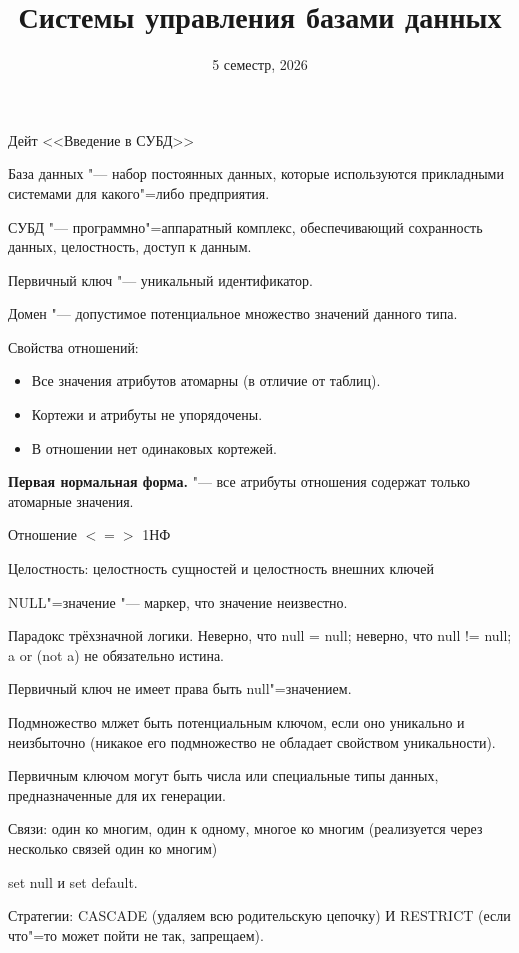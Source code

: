\documentclass[12pt]{article}
\begin{document}
\author{}
\title{Системы управления базами данных}
\date{5 семестр, 2026}
\maketitle

Дейт <<Введение в СУБД>>

База данных "--- набор постоянных данных, которые используются прикладными системами для какого"=либо предприятия.

СУБД "--- программно"=аппаратный комплекс, обеспечивающий сохранность данных, целостность, доступ к данным.

Первичный ключ "--- уникальный идентификатор.

Домен "--- допустимое потенциальное множество значений данного типа.

Свойства отношений:

\begin{itemize}
	\item Все значения атрибутов атомарны (в отличие от таблиц).
	\item Кортежи и атрибуты не упорядочены.
	\item В отношении нет одинаковых кортежей.
\end{itemize}

\textbf{Первая нормальная форма.} "--- все атрибуты отношения содержат только атомарные значения.

Отношение $<=>$ 1НФ

Целостность: целостность сущностей и целостность внешних ключей

NULL"=значение "--- маркер, что значение неизвестно.

Парадокс трёхзначной логики. Неверно, что null = null; неверно, что null != null; a or (not a) не обязательно истина. 

Первичный ключ не имеет права быть null"=значением.

Подмножество млжет быть потенциальным ключом, если оно уникально и неизбыточно (никакое его подмножество не обладает свойством уникальности).

Первичным ключом могут быть числа или специальные типы данных, предназначенные для их генерации.

Связи: один ко многим, один к одному, многое ко многим (реализуется через несколько связей один ко многим)

set null и set default.

Стратегии: CASCADE (удаляем всю родительскую цепочку) И RESTRICT (если что"=то может пойти не так, запрещаем).
\end{document}
